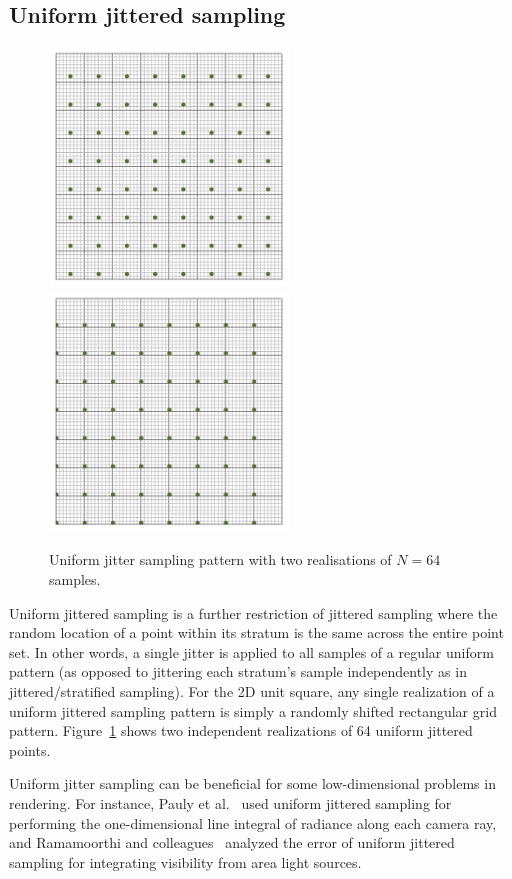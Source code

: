 \documentclass[11pt,fleqn]{book} %
\begin{document}
\subsection{Uniform jittered sampling}
%
\begin{figure}[ht]
  \centering
  \includegraphics[width=2.5in]{Pictures/pointset-gridvisualize/points-uniformjitter-n64-1.pdf}
    \includegraphics[width=2.5in]{./Pictures/pointset-gridvisualize/points-uniformjitter-n64.pdf}
  \caption{Uniform jitter sampling pattern with two realisations of $N=64$ samples.}
  \label{fig:uniformjitter}
\end{figure}
%
Uniform jittered sampling is a further restriction of jittered sampling where the random location of a point within its stratum is the same across the entire point set. In other words, a single jitter is applied to all samples of a regular uniform pattern (as opposed to jittering each stratum's sample independently as in jittered/stratified sampling). For the 2D unit square, any single realization of a uniform jittered sampling pattern is simply a randomly shifted rectangular grid pattern. Figure~\ref{fig:uniformjitter} shows two independent realizations of 64 uniform jittered points.

Uniform jitter sampling can be beneficial for some low-dimensional problems in rendering. For instance, Pauly et al.~\cite{pauly00metropolis} used uniform jittered sampling for performing the one-dimensional line integral of radiance along each camera ray, and Ramamoorthi and colleagues~\cite{Ramamoorthi:2012} analyzed the error of uniform jittered sampling for integrating visibility from area light sources.
\end{document}
